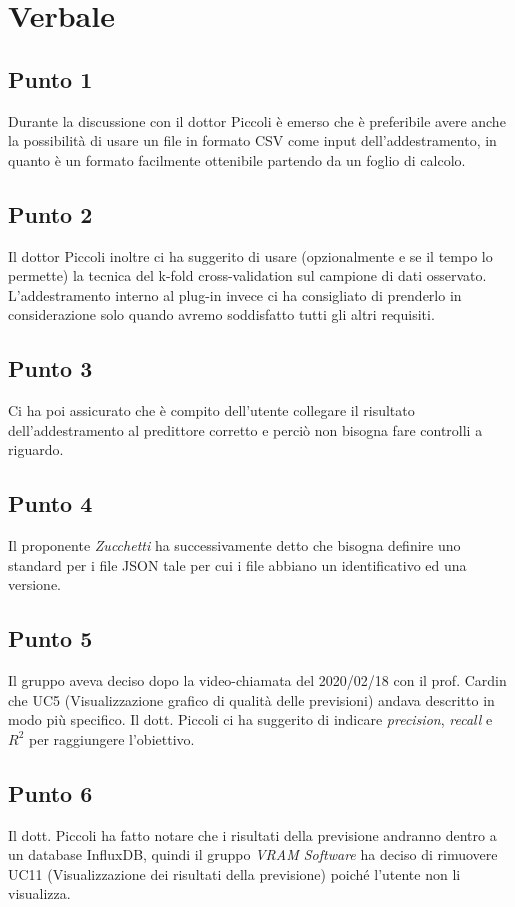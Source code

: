 \section{Verbale}
        \subsection{Punto 1}
            Durante la discussione con il dottor Piccoli è emerso che è preferibile avere anche la possibilità di usare un file in formato CSV come input dell'addestramento, in quanto è un formato facilmente ottenibile partendo da un foglio di calcolo.
        \subsection{Punto 2}
            Il dottor Piccoli inoltre ci ha suggerito di usare (opzionalmente e se il tempo lo permette) la tecnica del k-fold cross-validation sul campione di dati osservato. L'addestramento interno al plug-in invece ci ha consigliato di prenderlo in considerazione solo quando avremo soddisfatto tutti gli altri requisiti.
        \subsection{Punto 3}
            Ci ha poi assicurato che è compito dell'utente collegare il risultato dell'addestramento al predittore corretto e perciò non bisogna fare controlli a riguardo.
        \subsection{Punto 4}
            Il proponente \textit{Zucchetti} ha successivamente detto che bisogna definire uno standard per i file JSON tale per cui i file abbiano un identificativo ed una versione.
        \subsection{Punto 5}
        	Il gruppo aveva deciso dopo la video-chiamata del 2020/02/18 con il prof. Cardin che UC5 (Visualizzazione grafico di qualità delle previsioni) andava descritto in modo più specifico. Il dott. Piccoli ci ha suggerito di indicare \textit{precision}, \textit{recall} e \textit{$R^{2}$} per raggiungere l'obiettivo.
        \subsection{Punto 6}
        	Il dott. Piccoli ha fatto notare che i risultati della previsione andranno dentro a un database InfluxDB, quindi il gruppo \textit{VRAM Software} ha deciso di rimuovere UC11 (Visualizzazione dei risultati della previsione) poiché l'utente non li visualizza.